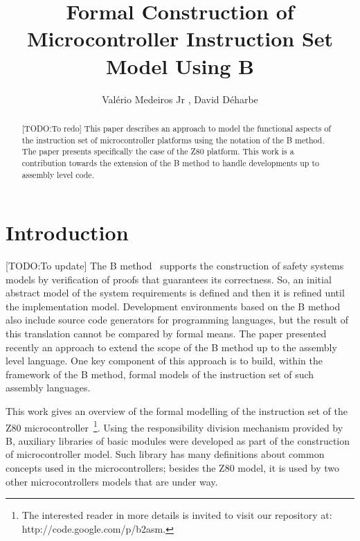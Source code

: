 \documentclass[11pt]{article} %
\begin{document}
\title{Formal Construction of Microcontroller Instruction Set Model Using B}


\author{Val\'{e}rio Medeiros Jr%
, David D\'{e}harbe%
}



\maketitle

\begin{abstract}
  [TODO:To redo]
  This paper describes an approach to model the functional aspects of
  the instruction set of microcontroller platforms using the notation
  of the B method. The paper presents specifically the case of the Z80 
  platform. This work is a contribution towards the extension of the
  B method to handle developments up to assembly level code.
\end{abstract}
%

\section{Introduction}
[TODO:To update] 
The B method~\cite{Abrial} supports the construction of safety systems
models by verification of proofs that guarantees its correctness. So,
an initial abstract model of the system requirements is defined and
then it is refined until the implementation model. Development
environments based on the B method also include source code generators
for programming languages, but the result of this translation
cannot be compared by formal means. The paper \cite{Dantas_SBMF08} presented
recently an approach to extend the scope of the B method up to the
assembly level language. One key component of this approach
is to build, within the framework of the B method, formal models of
the instruction set of such assembly languages.

This work gives an overview of the formal modelling of the instruction
set of the Z80 microcontroller~\cite{Z80_manual}\footnote{The
  interested reader in more details is invited to visit our repository
  at: http://code.google.com/p/b2asm.}. Using the responsibility
division mechanism provided by B, auxiliary libraries of basic modules
were developed as part of the construction of microcontroller
model. Such library has many definitions about common concepts used in
the microcontrollers; besides the Z80 model, it is used by two other
microcontrollers models that are under way.
\end{document}
